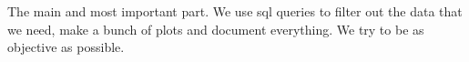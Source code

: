 The main and most important part.
We use sql queries to filter out the data that we need, make a bunch of plots and document everything.
We try to be as objective as possible.
